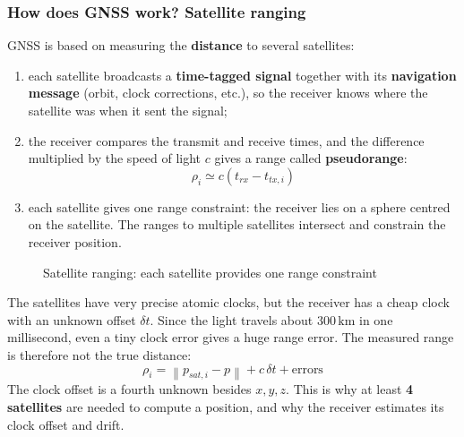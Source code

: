 \subsubsection{How does GNSS work? Satellite ranging}
GNSS is based on measuring the \textbf{distance} to several satellites:
\begin{enumerate}
    \item each satellite broadcasts a \textbf{time-tagged signal} together with its \textbf{navigation message} (orbit, clock corrections, etc.), so the receiver knows where the satellite was when it sent the signal;
    \item the receiver compares the transmit and receive times, and the difference multiplied by the speed of light $c$ gives a range called \textbf{pseudorange}:
    \[
    \rho_i \simeq c\left(t_{rx} - t_{tx,i}\right)
    \]
    \item each satellite gives one range constraint: the receiver lies on a sphere centred on the satellite. The ranges to multiple satellites intersect and constrain the receiver position.
\end{enumerate}

\begin{figure}[H]
    \centering
    \caption{Satellite ranging: each satellite provides one range constraint}
\end{figure}

\begin{infobox}
The satellites have very precise atomic clocks, but the receiver has a cheap clock with an unknown offset $\delta t$. Since the light travels about $300\,\mathrm{km}$ in one millisecond, even a tiny clock error gives a huge range error. The measured range is therefore not the true distance:
\[
\rho_i = \left\| p_{sat,i} - p \right\| + c\, \delta t + \text{errors}
\]
The clock offset is a fourth unknown besides $x, y, z$. This is why at least \textbf{4 satellites} are needed to compute a position, and why the receiver estimates its clock offset and drift.
\end{infobox}

